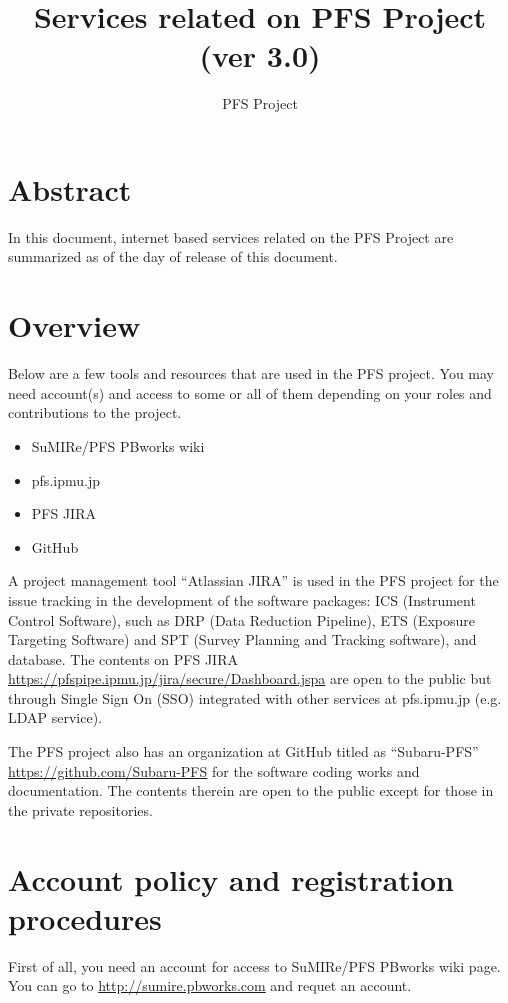 \documentclass[a4paper,notitlepage]{article}
\title{Services related on PFS Project (ver 3.0)}
\author{PFS Project}
\begin{document}
\maketitle
\tableofcontents

\section{Abstract}

In this document, internet based services related on the PFS Project
are summarized as of the day of release of this document.

\section{Overview}

Below are a few tools and resources that are used in the PFS
project. You may need account(s) and access to some or all of them
depending on your roles and contributions to the project.

\begin{itemize}
\item SuMIRe/PFS PBworks wiki
\item pfs.ipmu.jp
\item PFS JIRA
\item GitHub
\end{itemize}

A project management tool ``Atlassian JIRA'' is used in the PFS
project for the issue tracking in the development of the software
packages: ICS (Instrument Control Software), such as DRP (Data
Reduction Pipeline), ETS (Exposure Targeting Software) and SPT (Survey
Planning and Tracking software), and database. The contents on PFS
JIRA \url{https://pfspipe.ipmu.jp/jira/secure/Dashboard.jspa} are open
to the public but through Single Sign On (SSO) integrated with other
services at pfs.ipmu.jp (e.g. LDAP service).

The PFS project also has an organization at GitHub titled as
``Subaru-PFS'' \url{https://github.com/Subaru-PFS} for the software
coding works and documentation. The contents therein are open to the
public except for those in the private repositories.

\section{Account policy and registration procedures}

First of all, you need an account for access to SuMIRe/PFS PBworks
wiki page. You can go to \url{http://sumire.pbworks.com} and requet an
account.
\end{document}
